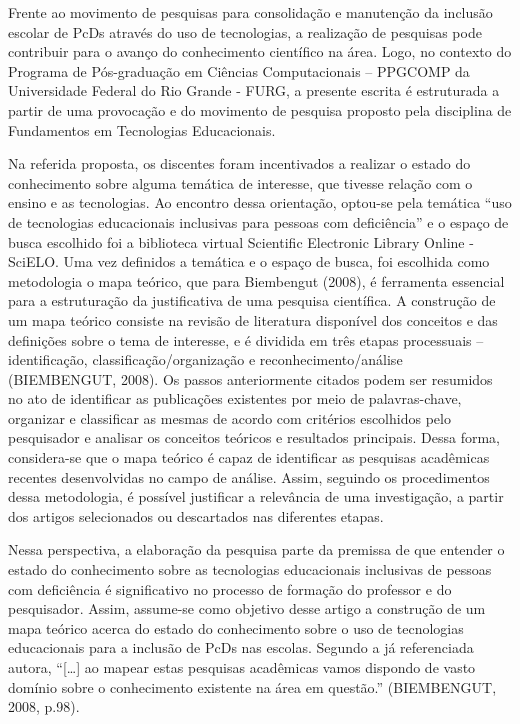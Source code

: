 \documentclass[preprint, 3p,
authoryear]{elsarticle} %
\begin{document}
Frente ao movimento de pesquisas para consolidação e manutenção da
inclusão escolar de PcDs através do uso de tecnologias, a realização de
pesquisas pode contribuir para o avanço do conhecimento científico na
área. Logo, no contexto do Programa de Pós-graduação em Ciências
Computacionais -- PPGCOMP da Universidade Federal do Rio Grande - FURG,
a presente escrita é estruturada a partir de uma provocação e do
movimento de pesquisa proposto pela disciplina de Fundamentos em
Tecnologias Educacionais.

Na referida proposta, os discentes foram incentivados a realizar o
estado do conhecimento sobre alguma temática de interesse, que tivesse
relação com o ensino e as tecnologias. Ao encontro dessa orientação,
optou-se pela temática ``uso de tecnologias educacionais inclusivas para
pessoas com deficiência'' e o espaço de busca escolhido foi a biblioteca
virtual Scientific Electronic Library Online - SciELO. Uma vez definidos
a temática e o espaço de busca, foi escolhida como metodologia o mapa
teórico, que para Biembengut (2008), é ferramenta essencial para a
estruturação da justificativa de uma pesquisa científica. A construção
de um mapa teórico consiste na revisão de literatura disponível dos
conceitos e das definições sobre o tema de interesse, e é dividida em
três etapas processuais -- identificação, classificação/organização e
reconhecimento/análise (BIEMBENGUT, 2008). Os passos anteriormente
citados podem ser resumidos no ato de identificar as publicações
existentes por meio de palavras-chave, organizar e classificar as mesmas
de acordo com critérios escolhidos pelo pesquisador e analisar os
conceitos teóricos e resultados principais. Dessa forma, considera-se
que o mapa teórico é capaz de identificar as pesquisas acadêmicas
recentes desenvolvidas no campo de análise. Assim, seguindo os
procedimentos dessa metodologia, é possível justificar a relevância de
uma investigação, a partir dos artigos selecionados ou descartados nas
diferentes etapas.

Nessa perspectiva, a elaboração da pesquisa parte da premissa de que
entender o estado do conhecimento sobre as tecnologias educacionais
inclusivas de pessoas com deficiência é significativo no processo de
formação do professor e do pesquisador. Assim, assume-se como objetivo
desse artigo a construção de um mapa teórico acerca do estado do
conhecimento sobre o uso de tecnologias educacionais para a inclusão de
PcDs nas escolas. Segundo a já referenciada autora, ``{[}\ldots{]} ao
mapear estas pesquisas acadêmicas vamos dispondo de vasto domínio sobre
o conhecimento existente na área em questão.'' (BIEMBENGUT, 2008, p.98).
\end{document}
